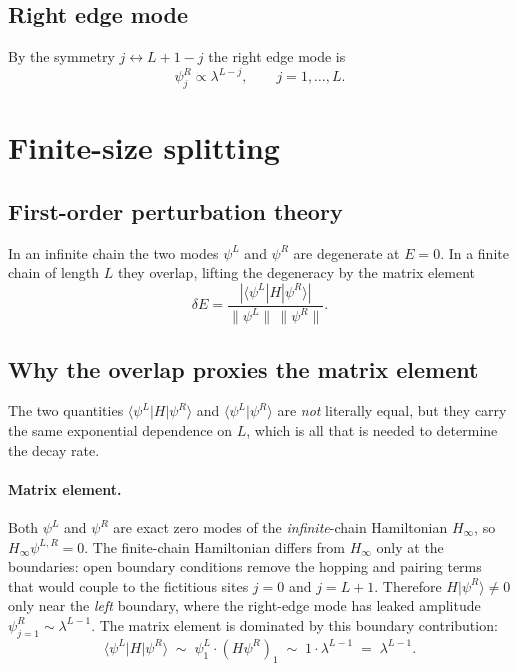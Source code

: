 \documentclass[11pt]{article}
\begin{document}
\subsection{Right edge mode}

By the symmetry $j \leftrightarrow L+1-j$ the right edge mode is
\begin{equation}
  \psi_j^R \propto \lambda^{L-j},
  \qquad j = 1, \ldots, L.
\end{equation}

\section{Finite-size splitting}

\subsection{First-order perturbation theory}

In an infinite chain the two modes $\psi^L$ and $\psi^R$ are degenerate at
$E = 0$.  In a finite chain of length $L$ they overlap, lifting the degeneracy
by the matrix element
\begin{equation}
  \delta E = \frac{|\langle \psi^L | H | \psi^R \rangle|}
                  {\|\psi^L\|\,\|\psi^R\|}.
\end{equation}

\subsection{Why the overlap proxies the matrix element}

The two quantities $\langle \psi^L | H | \psi^R \rangle$ and
$\langle \psi^L | \psi^R \rangle$ are \emph{not} literally equal, but they
carry the same exponential dependence on $L$, which is all that is needed
to determine the decay rate.

\paragraph{Matrix element.}
Both $\psi^L$ and $\psi^R$ are exact zero modes of the \emph{infinite}-chain
Hamiltonian $H_\infty$, so $H_\infty\psi^{L,R}=0$.
The finite-chain Hamiltonian differs from $H_\infty$ only at the boundaries:
open boundary conditions remove the hopping and pairing terms that would
couple to the fictitious sites $j=0$ and $j=L+1$.
Therefore $H|\psi^R\rangle \neq 0$ only near the \emph{left} boundary, where
the right-edge mode has leaked amplitude $\psi^R_{j=1}\sim\lambda^{L-1}$.
The matrix element is dominated by this boundary contribution:
\begin{equation}
  \langle \psi^L | H | \psi^R \rangle
  \;\sim\; \psi^L_1 \cdot (H\psi^R)_1
  \;\sim\; 1 \cdot \lambda^{L-1}
  \;=\; \lambda^{L-1}.
\end{equation}
\end{document}
